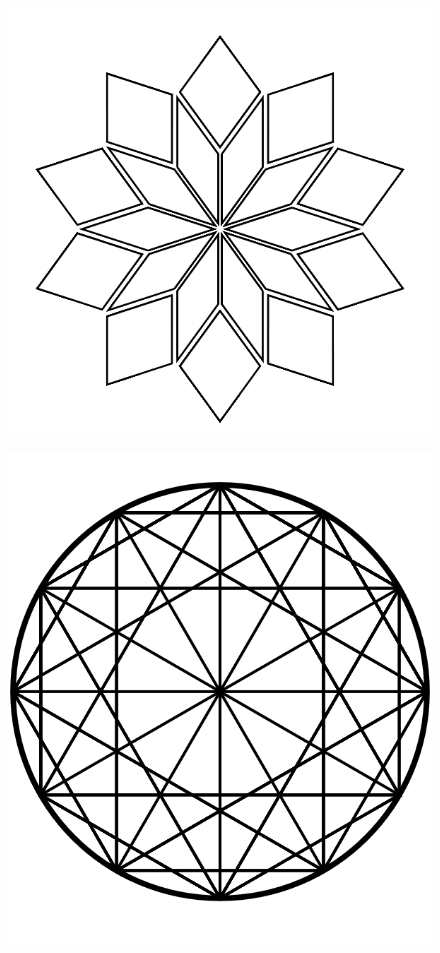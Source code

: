 \documentclass[17pt]{extreport}
\begin{document}
	\begin{figure}
		\centering
		\includegraphics[width=7.25in]{imageserver/uploadimages/penroseflower2.png}
	\end{figure}
	\begin{figure}
		\centering
		\includegraphics[width=7.25in]{imageserver/uploadimages/dodecagon.png}
	\end{figure}
\end{document}
